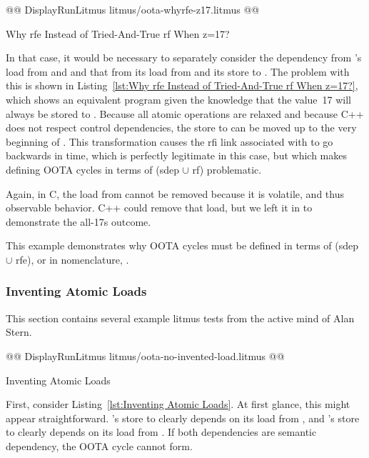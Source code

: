 \documentclass[10]{article}
\begin{document}
\begin{listing}[tbp]
@@ DisplayRunLitmus litmus/oota-whyrfe-z17.litmus @@
\caption{Why rfe Instead of Tried-And-True rf When z=17?}
\label{lst:Why rfe Instead of Tried-And-True rf When z=17?}
\end{listing}

In that case, it would be necessary to separately consider the dependency
from 's load from  and  and that from its load
from  and its store to .
The problem with this is shown in
Listing~\ref{lst:Why rfe Instead of Tried-And-True rf When z=17?},
which shows an equivalent program given the knowledge that the value~17
will always be stored to .
Because all atomic operations are relaxed and because C++ does not
respect control dependencies, the store to  can be moved up
to the very beginning of .
This transformation causes the rfi link associated with  to
go backwards in time, which is perfectly legitimate in this case,
but which makes defining OOTA cycles in terms of (sdep $\cup$ rf)
problematic.

Again, in C, the load from  cannot be removed because it is
volatile, and thus observable behavior.
C++ could remove that load, but we left it in to demonstrate the all-17s
outcome.

This example demonstrates why OOTA cycles must be defined in terms
of (sdep $\cup$ rfe), or in  nomenclature,
.

\subsubsection{Inventing Atomic Loads}
\label{app:Inventing Atomic Loads}

This section contains several example litmus tests from the active
mind of Alan Stern.

\begin{listing}[tbp]
@@ DisplayRunLitmus litmus/oota-no-invented-load.litmus @@
\caption{Inventing Atomic Loads}
\label{lst:Inventing Atomic Loads}
\end{listing}

First, consider Listing~\ref{lst:Inventing Atomic Loads}.
At first glance, this might appear straightforward.
's store to  clearly depends on its load from ,
and 's store to  clearly depends on its load from .
If both dependencies are semantic dependency, the OOTA cycle cannot
form.
\end{document}
